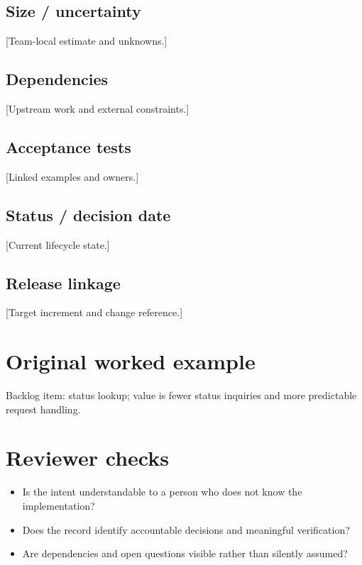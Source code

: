 \documentclass[11pt,letterpaper]{article}
\begin{document}
\subsection{Size / uncertainty}
[Team-local estimate and unknowns.]

\subsection{Dependencies}
[Upstream work and external constraints.]

\subsection{Acceptance tests}
[Linked examples and owners.]

\subsection{Status / decision date}
[Current lifecycle state.]

\subsection{Release linkage}
[Target increment and change reference.]

\section{Original worked example}
\begin{tcolorbox}[colback=tealback,colframe=navy,title={Illustrative entry},breakable]
Backlog item: status lookup; value is fewer status inquiries and more predictable request handling.

\end{tcolorbox}
\section{Reviewer checks}
\begin{itemize}[leftmargin=*,itemsep=2pt]
\item Is the intent understandable to a person who does not know the implementation?
\item Does the record identify accountable decisions and meaningful verification?
\item Are dependencies and open questions visible rather than silently assumed?
\end{itemize}
\end{document}
